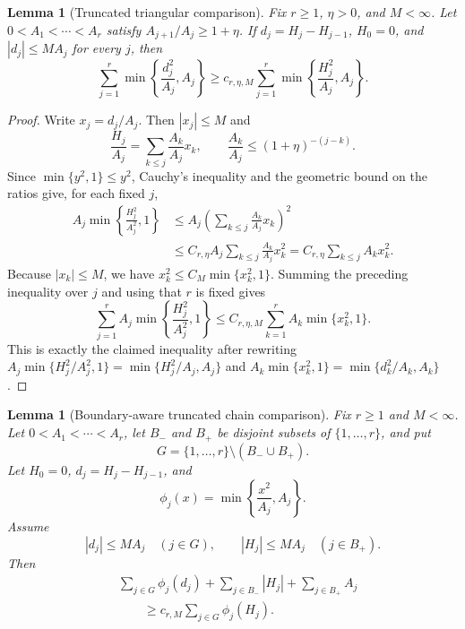 \documentclass[11pt]{article}
\newtheorem{lemma}[theorem]{Lemma}
\theoremstyle{remark}
\begin{document}
\begin{lemma}[Truncated triangular comparison]\label{lem:truncated-triangular-comparison}
Fix $r\ge1$, $\eta>0$, and $M<\infty$.  Let
$0<A_1<\cdots<A_r$ satisfy $A_{j+1}/A_j\ge1+\eta$.  If
$d_j=H_j-H_{j-1}$, $H_0=0$, and $|d_j|\le M A_j$ for every $j$, then
\[
        \sum_{j=1}^r
        \min\left\{\frac{d_j^2}{A_j},A_j\right\}
        \ge c_{r,\eta,M}
        \sum_{j=1}^r
        \min\left\{\frac{H_j^2}{A_j},A_j\right\}.
\]
\end{lemma}

\begin{proof}
Write $x_j=d_j/A_j$.  Then $|x_j|\le M$ and
\[
        \frac{H_j}{A_j}=\sum_{k\le j}\frac{A_k}{A_j}x_k,
        \qquad
        \frac{A_k}{A_j}\le (1+\eta)^{-(j-k)} .
\]
Since $\min\{y^2,1\}\le y^2$, Cauchy's inequality and the geometric
bound on the ratios give, for each fixed $j$,
\[
\begin{aligned}
        A_j\min\left\{\frac{H_j^2}{A_j^2},1\right\}
        &\le A_j\left(\sum_{k\le j}\frac{A_k}{A_j}x_k\right)^2  \\
        &\le C_{r,\eta} A_j\sum_{k\le j}\frac{A_k}{A_j}x_k^2
         = C_{r,\eta}\sum_{k\le j} A_k x_k^2 .
\end{aligned}
\]
Because $|x_k|\le M$, we have
$x_k^2\le C_M\min\{x_k^2,1\}$.  Summing the preceding inequality over
$j$ and using that $r$ is fixed gives
\[
        \sum_{j=1}^r A_j
        \min\left\{\frac{H_j^2}{A_j^2},1\right\}
        \le C_{r,\eta,M}
        \sum_{k=1}^r A_k\min\{x_k^2,1\}.
\]
This is exactly the claimed inequality after rewriting
$A_j\min\{H_j^2/A_j^2,1\}=\min\{H_j^2/A_j,A_j\}$ and
$A_k\min\{x_k^2,1\}=\min\{d_k^2/A_k,A_k\}$.
\end{proof}

\begin{lemma}[Boundary-aware truncated chain comparison]
\label{lem:boundary-truncated-chain}
Fix \(r\ge1\) and \(M<\infty\).  Let
\(0<A_1<\cdots<A_r\), let \(B_-\) and \(B_+\) be disjoint subsets of
\(\{1,\ldots,r\}\), and put
\[
        G=\{1,\ldots,r\}\setminus(B_-\cup B_+).
\]
Let \(H_0=0\), \(d_j=H_j-H_{j-1}\), and
\[
        \phi_j(x)=\min\left\{\frac{x^2}{A_j},A_j\right\}.
\]
Assume
\[
        |d_j|\le M A_j\quad(j\in G),
        \qquad
        |H_j|\le M A_j\quad(j\in B_+).
\]
Then
\[
\begin{aligned}
&\sum_{j\in G}\phi_j(d_j)
 +\sum_{j\in B_-}|H_j|
 +\sum_{j\in B_+}A_j\\
&\qquad\ge c_{r,M}
 \sum_{j\in G}\phi_j(H_j).
\end{aligned}
\]
\end{lemma}
\end{document}
